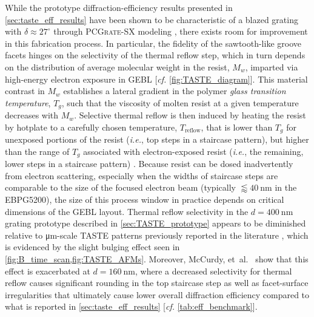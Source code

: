 While the prototype diffraction-efficiency results presented in \cref{sec:taste_eff_results} have been shown to be characteristic of a blazed grating with $\delta \approx 27^{\circ}$ through \textsc{PCGrate-SX} modeling \cite[\emph{cf.\@} \cref{sec:integral_method}]{PCGrate_web,Goray10}, there exists room for improvement in this fabrication process. 
In particular, the fidelity of the sawtooth-like groove facets hinges on the selectivity of the thermal reflow step, which in turn depends on the distribution of average molecular weight in the resist, $M_w$, imparted via high-energy electron exposure in GEBL [\emph{cf.\@} \cref{fig:TASTE_diagram}]. 
This material contrast in $M_w$ establishes a lateral gradient in the polymer \emph{glass transition temperature}, $T_g$, such that the viscosity of molten resist at a given temperature decreases with $M_w$. 
Selective thermal reflow is then induced by heating the resist by hotplate to a carefully chosen temperature, $T_{\text{reflow}}$, that is lower than $T_g$ for unexposed portions of the resist (\emph{i.e.}, top steps in a staircase pattern), but higher than the range of $T_g$ associated with electron-exposed resist (\emph{i.e.}, the remaining, lower steps in a staircase pattern) \cite{Schleunitz14,Kirchner19}. 
Because resist can be dosed inadvertently from electron scattering, especially when the widths of staircase steps are comparable to the size of the focused electron beam (typically $\lessapprox \SI{40}{\nm}$ in the \textsc{EBPG5200}), the size of this process window in practice depends on critical dimensions of the GEBL layout. 
Thermal reflow selectivity in the $d = \SI{400}{\nm}$ grating prototype described in \cref{sec:TASTE_prototype} appears to be diminished relative to \si{\um}-scale TASTE patterns previously reported in the literature \cite{Schleunitz10,Schleunitz14,Kirchner16,Pfirrmann16}, which is evidenced by the slight bulging effect seen in \cref{fig:B_time_scan,fig:TASTE_AFMs}.  
Moreover, McCurdy, et~al.~\cite{McCurdy20} show that this effect is exacerbated at $d = \SI{160}{\nm}$, where a decreased selectivity for thermal reflow causes significant rounding in the top staircase step as well as facet-surface irregularities that ultimately cause lower overall diffraction efficiency compared to what is reported in \cref{sec:taste_eff_results} [\emph{cf.\@} \cref{tab:eff_benchmark}]. %

